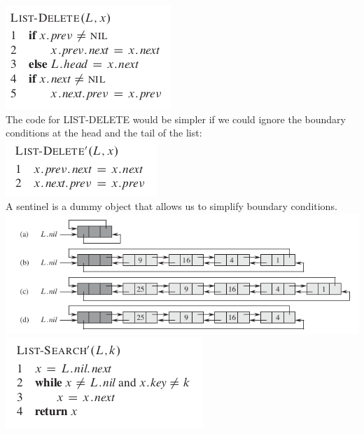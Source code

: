 \documentclass[11pt]{article}
\begin{document}
\includegraphics[width=.9\linewidth]{pics/c10_linked_list_delete.png} \\

The code for LIST-DELETE would be simpler if we could ignore the boundary conditions at the head and the tail of the list: \\

\includegraphics[width=.9\linewidth]{pics/c10_linked_list_delete2.png} \\

A sentinel is a dummy object that allows us to simplify boundary conditions. \\

\includegraphics[width=.9\linewidth]{pics/c10_linked_list_2.png} \\

\includegraphics[width=.9\linewidth]{pics/c10_linked_list_search_2.png} \\
\end{document}

